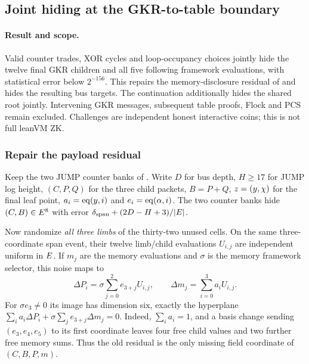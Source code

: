 \subsection{Joint hiding at the GKR-to-table boundary}\label{note:zk-bus-boundary}

\paragraph{Result and scope.} Valid counter trades, XOR cycles and loop-occupancy choices jointly hide the twelve final GKR children and all five following framework evaluations, with statistical error below $2^{-156}$. This repairs the memory-disclosure residual of  and hides the resulting bus targets. The continuation  additionally hides the shared root jointly. Intervening GKR messages, subsequent table proofs, Flock and PCS remain excluded. Challenges are independent honest interactive coins; this is not full leanVM ZK.

\subsubsection{Repair the payload residual}

Keep the two JUMP counter banks of . Write $D$ for bus depth, $H\ge17$ for JUMP log height, $(C,P,Q)$ for the three child packets, $B=P+Q$, $z=(y,\chi)$ for the final leaf point, $a_i=\operatorname{eq}(y,i)$ and $e_i=\operatorname{eq}(\alpha,i)$. The two counter banks hide $(C,B)\in E^8$ with error $\delta_{\mathrm{span}}+(2D-H+3)/|E|$.

Now randomize \emph{all three limbs} of the thirty-two unused cells. On the same three-coordinate span event, their twelve limb/child evaluations $U_{i,j}$ are independent uniform in $E$. If $m_j$ are the memory evaluations and $\sigma$ is the memory framework selector, this noise maps to
\[
 \Delta P_i=\sigma\sum_{j=0}^2e_{3+j}U_{i,j},\qquad
 \Delta m_j=\sum_{i=0}^3a_iU_{i,j}.
\]
For $\sigma e_3\ne0$ its image has dimension six, exactly the hyperplane $\sum_i a_i\Delta P_i+\sigma\sum_j e_{3+j}\Delta m_j=0$. Indeed, $\sum_i a_i=1$, and a basis change sending $(e_3,e_4,e_5)$ to its first coordinate leaves four free child values and two further free memory sums. Thus the old residual is the only missing field coordinate of $(C,B,P,m)$.

